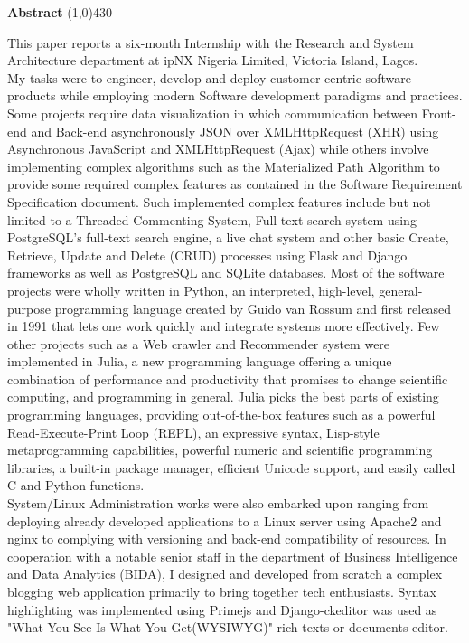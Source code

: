 \begin{center}
	{\huge \bf Abstract}
	\line(1,0){430}
\end{center}

This paper reports a six-month Internship with the Research and System Architecture department at ipNX Nigeria Limited, Victoria Island, Lagos.\\ 

My tasks were to engineer, develop and deploy customer-centric software products while employing modern Software development paradigms and practices. Some projects require data visualization in which communication between Front-end and Back-end asynchronously JSON over XMLHttpRequest (XHR) using Asynchronous JavaScript and XMLHttpRequest (Ajax) while others involve implementing complex algorithms such as the Materialized Path Algorithm to provide some required complex features as contained in the Software Requirement Specification document. Such implemented complex features include but not limited to a Threaded Commenting System, Full-text search system using PostgreSQL's full-text search engine, a live chat system and other basic Create, Retrieve, Update and Delete (CRUD) processes using Flask and Django frameworks as well as PostgreSQL and SQLite databases. Most of the software projects were wholly written in Python, an interpreted, high-level, general-purpose programming language created by Guido van Rossum and first released in 1991 that lets one work quickly and integrate systems more effectively. Few other projects such as a Web crawler and Recommender system were implemented in Julia, a new programming language offering a unique combination of performance and
productivity that promises to change scientific computing, and programming in general.
Julia picks the best parts of existing programming languages, providing out-of-the-box
features such as a powerful Read-Execute-Print Loop (REPL), an expressive syntax, Lisp-style metaprogramming capabilities, powerful numeric and scientific programming libraries, a built-in package manager, efficient Unicode support, and easily called C and Python functions.\\

System/Linux Administration works were also embarked upon ranging from deploying already developed applications to a Linux server using Apache2 and nginx to complying with versioning and back-end compatibility of resources. In cooperation with a notable senior staff in the department of Business Intelligence and Data Analytics (BIDA), I designed and developed from scratch a complex blogging web application  primarily to bring together tech enthusiasts.  Syntax highlighting was implemented using Primejs and Django-ckeditor was used as "What You See Is What You Get(WYSIWYG)" rich texts or documents editor.
\clearpage